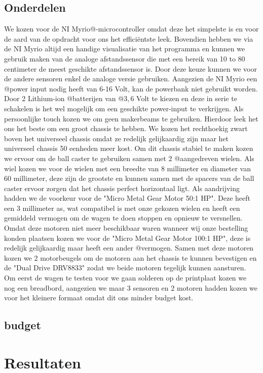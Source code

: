 \documentclass[a4paper,twoside,kulak]{kulakreport}
\begin{document}
	\section{Onderdelen}
	We kozen voor de NI Myrio@-microcontroller omdat deze het simpelste is en voor de aard van de opdracht voor ons het efficiëntste leek. Bovendien hebben we via de NI Myrio altijd een handige visualisatie van het programma en kunnen we gebruik maken van de analoge afstandssensor die met een bereik van 10 to 80 centimeter de meest geschikte afstandssensor is.
	Door deze keuze kunnen we voor de andere sensoren enkel de analoge versie gebruiken. Aangezien de NI Myrio een @power input nodig heeft van 6-16 Volt, kan de powerbank niet gebruikt worden. Door 2 Lithium-ion @batterijen van @$3,6$ Volt te kiezen en deze in serie te schakelen is het wel mogelijk om een geschikte power-input te verkrijgen.
	Als persoonlijke touch kozen we om geen makerbeams te gebruiken. Hierdoor leek het ons het beste om een groot chassis te hebben. We kozen het rechthoekig zwart boven het universeel chassis omdat ze redelijk gelijkaardig zijn maar het universeel chassis 50 eenheden meer kost. Om dit chassis stabiel te maken kozen we ervoor om de ball caster te gebruiken samen met 2 @aangedreven wielen. Als wiel kozen we voor de wielen met een breedte van 8 millimeter en diameter van 60 millimeter, deze zijn de grootste en kunnen samen met de spacers van de ball caster ervoor zorgen dat het chassis perfect horizontaal ligt. Als aandrijving hadden we de voorkeur voor de "Micro Metal Gear Motor 50:1 HP". Deze heeft een 3 millimeter as, wat compatibel is met onze gekozen wielen en heeft een gemiddeld vermogen om de wagen te doen stoppen en opnieuw te versnellen. Omdat deze motoren niet meer beschikbaar waren wanneer wij onze bestelling konden plaatsen kozen we voor de "Micro Metal Gear Motor 100:1 HP", deze is redelijk gelijkaardig maar heeft een ander @vermogen. Samen met deze motoren kozen we 2 motorbeugels om de motoren aan het chassis te kunnen bevestigen en de "Dual Drive DRV8833" zodat we beide motoren tegelijk kunnen aansturen.
	Om eerst de wagen te testen voor we gaan solderen op de printplaat kozen we nog een breadbord, aangezien we maar 3 sensoren en 2 motoren hadden kozen we voor het kleinere formaat omdat dit ons minder budget kost.  
	
	\section{budget}
	
	
	\chapter{Resultaten}
	
\end{document}
